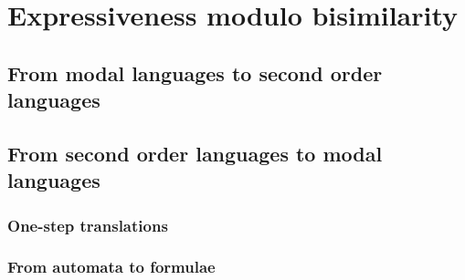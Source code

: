\documentclass[prodmode,acmtecs]{acmsmall} %
\begin{document}




\clearpage

\section{Expressiveness modulo bisimilarity}\label{sec:expresso}

\subsection{From modal languages to second order languages}

\subsection{From second order languages to modal languages}



\subsubsection{One-step translations}\label{pinvariant-fragment}


\subsubsection{From automata to formulae}\label{aut-to-formula}


\clearpage






\end{document}

